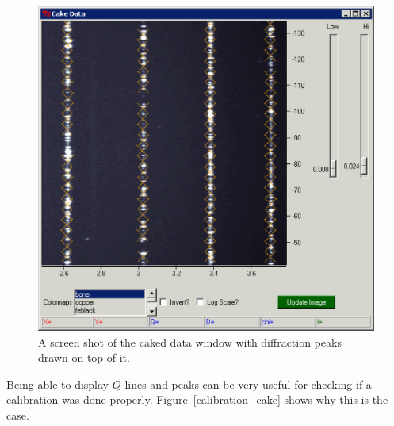 \begin{figure}
    \centering
    \includegraphics[scale=.75]{figures/peaks_on_cake_image.eps}
    \caption{A screen shot of the caked data window
    with diffraction peaks drawn on top of it.}
    \label{peaks_on_cake_image}
\end{figure}

Being able to display $Q$ lines and peaks can
be very useful for checking if a calibration was 
done properly. Figure~\ref{calibration_cake} shows
why this is the case. 

